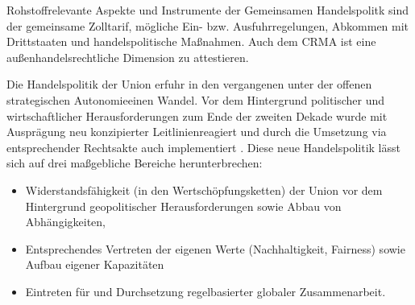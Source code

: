 \documentclass[12pt,a4paper,oneside]{book} %
\begin{document}
Rohstoffrelevante Aspekte und Instrumente der Gemeinsamen Handelspolitk sind der gemeinsame Zolltarif, mögliche Ein- bzw. Ausfuhrregelungen, Abkommen mit Drittstaaten und handelspolitische Maßnahmen.\autocite{Schorkopf, Rohstoffverwaltung, Rn. 40.} Auch dem CRMA ist eine außenhandelsrechtliche Dimension zu attestieren.\autocite{Palmstorfer/Staudinger: Unilaterale EU-Maßnahmen zu Binnenmarkt und Umweltschutz mit Auswirkungen auf den Außenhandel, EuZW 2025, 685}

Die Handelspolitik der Union erfuhr in den vergangenen unter der \glqq offenen strategischen Autonomie\grqq einen Wandel. Vor dem Hintergrund politischer und wirtschaftlicher Herausforderungen zum Ende der zweiten Dekade wurde mit Ausprägung neu konzipierter \glqq Leitlinien\grqq reagiert und durch die Umsetzung via entsprechender Rechtsakte auch implementiert \autocite{RdTW 2024, 217}. Diese neue Handelspolitik lässt sich auf drei maßgebliche Bereiche herunterbrechen:

\begin{itemize}
	\item Widerstandsfähigkeit (in den Wertschöpfungsketten) der Union vor dem Hintergrund geopolitischer Herausforderungen sowie Abbau von Abhängigkeiten,
	\item Entsprechendes Vertreten der eigenen Werte (Nachhaltigkeit, Fairness) sowie Aufbau eigener Kapazitäten
	\item Eintreten für und Durchsetzung regelbasierter globaler Zusammenarbeit.\autocites{ZRP 2023, 207}{DGAP Policy Brief 8/2021}{COM 2021 66, S. 4f.}
\end{itemize}
\end{document}
